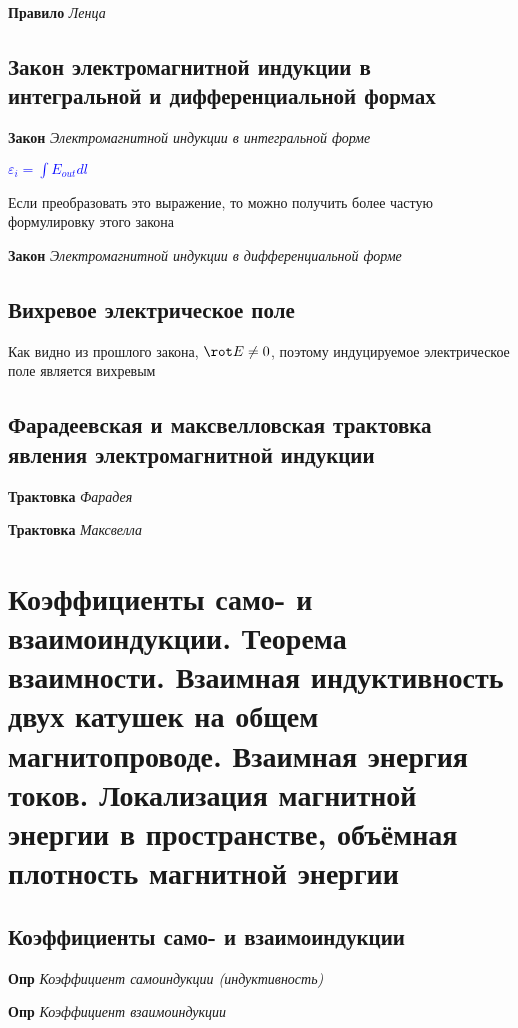 \documentclass[a4paper, 14pt]{article}
\begin{document}
    \textbf{Правило} \textit{Ленца}
    
    \subsection{Закон электромагнитной индукции в интегральной и дифференциальной формах}
    
    \textbf{Закон} \textit{Электромагнитной индукции в интегральной форме}
    
    \textcolor{blue}{$\varepsilon_i = \int E_{out} dl$}
    
    Если преобразовать это выражение, то можно получить более частую формулировку этого закона
    
    \textbf{Закон} \textit{Электромагнитной индукции в дифференциальной форме}
    
    \subsection{Вихревое электрическое поле}
    
    Как видно из прошлого закона, $\rot E \neq 0$, поэтому индуцируемое электрическое поле является вихревым
    
    \subsection{Фарадеевская и максвелловская трактовка явления электромагнитной индукции}
    
    \textbf{Трактовка} \textit{Фарадея}
    
    \textbf{Трактовка} \textit{Максвелла}
    
    \section{Коэффициенты само- и взаимоиндукции.
    Теорема взаимности.
    Взаимная индуктивность двух катушек на общем магнитопроводе.
    Взаимная энергия токов.
    Локализация магнитной энергии в пространстве, объёмная плотность магнитной энергии}
    
    \subsection{Коэффициенты само- и взаимоиндукции}
    
    \textbf{Опр} \textit{Коэффициент самоиндукции (индуктивность)}
    
    \textbf{Опр} \textit{Коэффициент взаимоиндукции}
    
\end{document}
